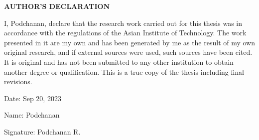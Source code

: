 \begin{center}
    \large{\bf AUTHOR'S DECLARATION}
\end{center}

I, Podchanan, declare that the research work carried out for this thesis was in accordance with the regulations of the Asian Institute of Technology. The work presented in it are my own and has been generated by me as the result of my own original research, and if external sources were used, such sources have been cited. It is original and has not been submitted to any other institution to obtain another degree or qualification. This is a true copy of the thesis including final revisions.

Date: Sep 20, 2023

Name: Podchanan

Signature: Podchanan R.
